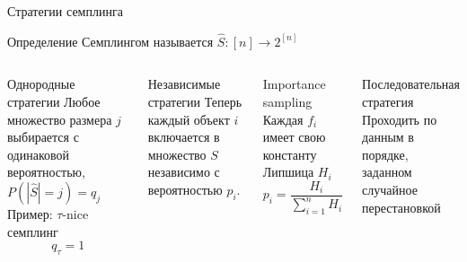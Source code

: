 \documentclass{beamer}
\begin{document}
\begin{frame}{Стратегии семплинга}
	
	\begin{block}{Определение}
		Семплингом называется $\hat S: [n] \rightarrow 2^{[n]}$ 
	\end{block}
	
\begin{columns}[c]
    \begin{block}{Однородные стратегии}	
    	Любое множество размера $j$ выбирается с одинаковой вероятностью, $P(|\hat S| = j) = q_j$
    	Пример: $\tau$-nice семплинг \\
    		$$ q_\tau = 1 $$
    \end{block}
	\begin{block}{Независимые стратегии}
		Теперь каждый объект $i$ включается в множество $S$ независимо с вероятностью $p_i$.
	\end{block}
    \begin{block}{Importance sampling}
    	Каждая $f_i$ имеет свою константу Липшица $H_i$
    	$$p_i = \frac{H_i}{\sum \limits_{i=1}^n H_i}$$
    \end{block}
	\begin{block}{Последовательная стратегия}
		Проходить по данным в порядке, заданном случайное перестановкой
	\end{block}
\end{columns}

\end{frame}
\end{document}

